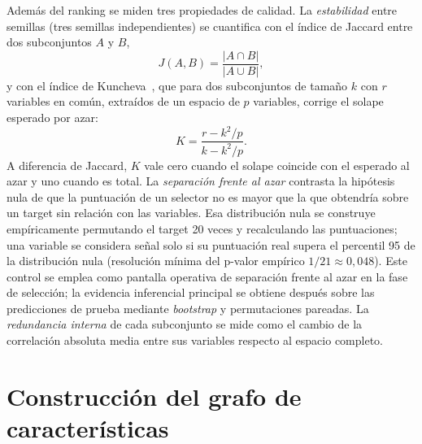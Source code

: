 Además del ranking se miden tres propiedades de calidad. La
\emph{estabilidad} entre semillas (tres semillas independientes) se
cuantifica con el índice de Jaccard entre dos subconjuntos $A$ y $B$,
\begin{equation}
  \label{eq:jaccard}
  J(A,B) = \frac{|A \cap B|}{|A \cup B|},
\end{equation}
y con el índice de Kuncheva~\cite{kuncheva2007}, que para dos
subconjuntos de tamaño $k$ con $r$ variables en común, extraídos de un
espacio de $p$ variables, corrige el solape esperado por azar:
\begin{equation}
  \label{eq:kuncheva}
  K = \frac{r - k^2/p}{k - k^2/p}.
\end{equation}
A diferencia de Jaccard, $K$ vale cero cuando el solape coincide con el
esperado al azar y uno cuando es total. La \emph{separación frente
al azar} contrasta la hipótesis nula de que la puntuación de un selector
no es mayor que la que obtendría sobre un target sin relación con las
variables. Esa distribución nula se construye empíricamente permutando
el target 20 veces y recalculando las puntuaciones; una variable se
considera señal solo si su puntuación real supera el percentil 95 de la
distribución nula (resolución mínima del p-valor empírico
$1/21 \approx 0{,}048$). Este control se emplea como pantalla operativa
de separación frente al azar en la fase de selección; la evidencia
inferencial principal se obtiene después sobre las predicciones de prueba
mediante \textit{bootstrap} y permutaciones pareadas. La \emph{redundancia interna} de cada subconjunto
se mide como el cambio de la correlación absoluta media entre sus
variables respecto al espacio completo.

\section{Construcción del grafo de características}
\label{sec:grafo}

